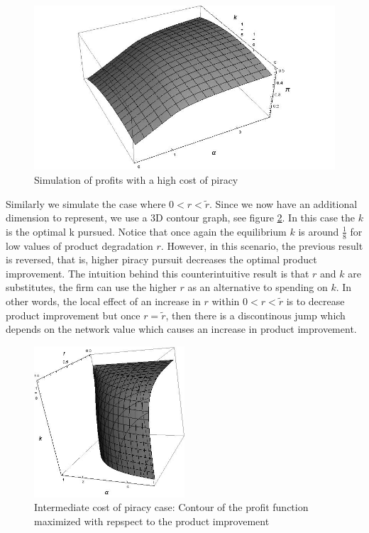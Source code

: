 \begin{figure}[h!] 
\centering
\includegraphics[width=1.0\textwidth]{./figures/Endogenousksimulation0.jpg}
\caption{Simulation of profits with a high cost of piracy }
\label{endk1}
\end{figure}

Similarly we simulate the case where $0<r<\tilde{r}$. Since we now have an additional dimension to represent, we use a 3D contour graph, see figure \ref{endk2}. In this case the $k$ is the optimal k pursued. Notice that once again the equilibrium $k$ is around $\frac{1}{8}$ for low values of product degradation $r$. However, in this scenario, the previous result is reversed, that is, higher piracy pursuit decreases the optimal product improvement. The intuition behind this counterintuitive result is that $r$ and $k$ are substitutes, the firm can use the higher $r$ as an alternative to spending on $k$. In other words, the local effect of an increase in $r$ within $0<r<\tilde{r}$ is to decrease product improvement but once $r=\tilde{r}$, then there is a discontinous jump which depends on the network value which causes an increase in product improvement. 


\begin{figure}[t!] 
\centering
\includegraphics[width=0.5\textwidth]{./figures/Endogenousksimulation.jpg}
\caption{Intermediate cost of piracy case: Contour of the profit function maximized with repspect to the product improvement}
\label{endk2}
\end{figure}


